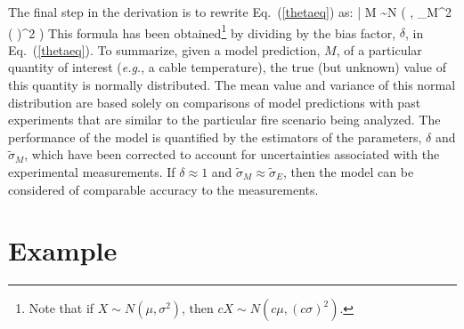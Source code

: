 The final step in the derivation is to rewrite Eq.~(\ref{thetaeq}) as:
\be
   \theta \; | \; M \sim N \left(  \; , \; \widetilde{\sigma}_M^2 \left(  \right)^2 \right) \label{truth}
\ee
This formula has been obtained\footnote{Note that if $X \sim N(\mu,\sigma^2)$, then
$cX \sim N ( c \mu , (c \sigma)^2)$.} by dividing by the bias factor, $\delta$, in Eq.~(\ref{thetaeq}). To summarize, given a model prediction, $M$,
of a particular quantity of interest ({\em e.g.}, a cable temperature), the true (but unknown) value of this quantity is normally distributed. The mean value
and variance of this normal distribution are based solely on comparisons of model predictions with past experiments that are similar to the particular fire
scenario being analyzed. The performance of the model is quantified by the estimators of the parameters, $\delta$ and $\widetilde{\sigma}_M$, which
have been corrected to account for uncertainties associated with the experimental measurements.
If $\delta \approx 1$ and $\widetilde{\sigma}_M \approx \widetilde{\sigma}_E$, then the
model can be considered of comparable accuracy to the measurements.


\section{Example}

